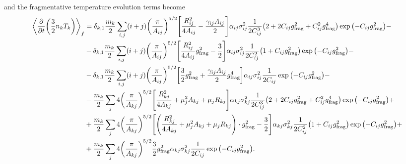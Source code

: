 \documentclass[aps,prl,preprint,groupedaddress,10pt]{revtex4-2}
\begin{document}
and the fragmentative temperature evolution terms become
\begin{equation}
    \begin{split}
        \avg{\pdv{t}\pqty{\frac{3}{2}n_kT_k}}_f&=\delta_{k,1}\frac{m_k}{2}
        \sum_{i,j}(i+j)\pqty{\frac{\pi}{A_{ij}}}^{5/2}
        \bqty{\frac{R_{ij}^2}{4A_{ij}}-\frac{\gamma_{ij}A_{ij}}{2}}
        \alpha_{ij}\sigma_{ij}^2\frac{1}{2C_{ij}^3}\pqty{2+2C_{ij}\ltx{g}{frag}^2+C_{ij}^2
        \ltx{g}{frag}^4}\exp\pqty{-C_{ij}\ltx{g}{frag}^2}-\\
        &-\delta_{k,1}\frac{m_k}{2}
        \sum_{i,j}(i+j)\pqty{\frac{\pi}{A_{ij}}}^{5/2}
        \bqty{\frac{R_{ij}^2}{4A_{ij}}\ltx{g}{frag}^2-\frac{3}{2}}
        \alpha_{ij}\sigma_{ij}^2\frac{1}{2C_{ij}^2}\pqty{1+C_{ij}\ltx{g}{frag}^2}
        \exp\pqty{-C_{ij}\ltx{g}{frag}^2}-\\
        &-\delta_{k,1}\frac{m_k}{2}
        \sum_{i,j}(i+j)\pqty{\frac{\pi}{A_{ij}}}^{5/2}
        \bqty{\frac{3}{2}\ltx{g}{frag}^2+\frac{\gamma_{ij}A_{ij}}{2}\ltx{g}{frag}^4}
        \alpha_{ij}\sigma_{ij}^2\frac{1}{2C_{ij}}\exp\pqty{-C_{ij}\ltx{g}{frag}^2}-\\
        &-\frac{m_k}{2}\sum_{j}4\pqty{\frac{\pi}{A_{kj}}}^{5/2}
        \bqty{\frac{R_{kj}^2}{4A_{kj}}+\mu_j^2A_{kj}+\mu_jR_{kj}}
        \alpha_{kj}\sigma_{kj}^2
        \frac{1}{2C_{ij}^3}\pqty{2+2C_{ij}\ltx{g}{frag}^2+C_{ij}^2\ltx{g}{frag}^4}
        \exp\pqty{-C_{ij}\ltx{g}{frag}^2}+\\
        &+\frac{m_k}{2}\sum_{j}4\pqty{\frac{\pi}{A_{kj}}}^{5/2}
        \bqty{\pqty{\frac{R_{kj}^2}{4A_{kj}}+\mu_j^2A_{kj}+\mu_jR_{kj}}\cdot\ltx{g}{frag}^2
        -\frac{3}{2}}
        \alpha_{kj}\sigma_{kj}^2
        \frac{1}{2C_{ij}^2}\pqty{1+C_{ij}\ltx{g}{frag}^2}\exp\pqty{-C_{ij}\ltx{g}{frag}^2}+\\
        &+\frac{m_k}{2}\sum_{j}4\pqty{\frac{\pi}{A_{kj}}}^{5/2}
        \frac{3}{2}\ltx{g}{frag}^2\alpha_{kj}
        \sigma_{kj}^2\frac{1}{2C_{ij}}\exp\pqty{-C_{ij}\ltx{g}{frag}^2}.
    \end{split}
\end{equation}
\end{document}
